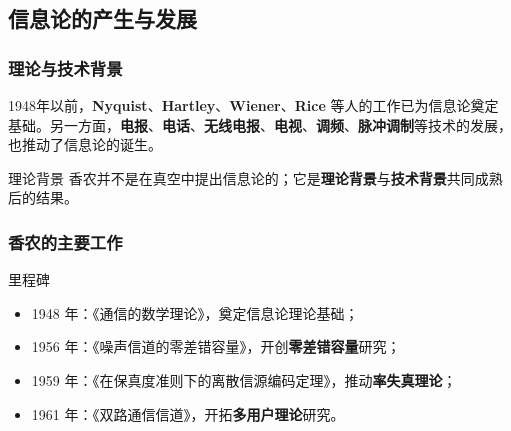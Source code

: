 \subsection{信息论的产生与发展}

\subsubsection{理论与技术背景}
1948年以前，\textbf{Nyquist}、\textbf{Hartley}、\textbf{Wiener}、\textbf{Rice} 等人的工作已为信息论奠定基础。另一方面，\textbf{电报}、\textbf{电话}、\textbf{无线电报}、\textbf{电视}、\textbf{调频}、\textbf{脉冲调制}等技术的发展，也推动了信息论的诞生。

\begin{warningBox}{理论背景}
香农并不是在真空中提出信息论的；它是\textbf{理论背景}与\textbf{技术背景}共同成熟后的结果。
\end{warningBox}

\subsubsection{香农的主要工作}
\begin{methodBox}{里程碑}
\begin{itemize}
  \item 1948 年：《通信的数学理论》，奠定信息论理论基础；
  \item 1956 年：《噪声信道的零差错容量》，开创\textbf{零差错容量}研究；
  \item 1959 年：《在保真度准则下的离散信源编码定理》，推动\textbf{率失真理论}；
  \item 1961 年：《双路通信信道》，开拓\textbf{多用户理论}研究。
\end{itemize}
\end{methodBox}

